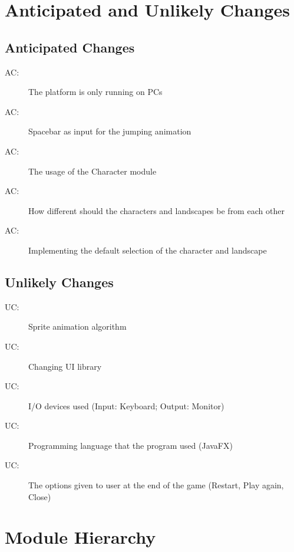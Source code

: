 \documentclass[12pt, titlepage]{article}
\newcounter{acnum}
\newcommand{\actheacnum}{AC\theacnum}
\newcounter{ucnum}
\newcommand{\uctheucnum}{UC\theucnum}
\begin{document}
\section{Anticipated and Unlikely Changes} \label{SecChange}

\subsection{Anticipated Changes} \label{SecAchange}
\begin{description}
\item[ \actheacnum \label{ac1}:] The platform is only running on PCs
\item[ \actheacnum \label{ac2}:] Spacebar as input for the jumping animation
\item[ \actheacnum \label{ac3}:] The usage of the Character module
\item[ \actheacnum \label{ac4}:] How different should the characters and landscapes be from each other
\item[ \actheacnum \label{ac5}:] Implementing the default selection of the character and landscape
\end{description}

\subsection{Unlikely Changes} \label{SecUchange}
\begin{description}
\item[ \uctheucnum \label{uc1}:] Sprite animation algorithm
\item[ \uctheucnum \label{uc2}:] Changing UI library
\item[ \uctheucnum \label{uc3}:] I/O devices used (Input: Keyboard; Output: Monitor)
\item[ \uctheucnum \label{uc4}:] Programming language that the program used (JavaFX)
\item[ \uctheucnum \label{uc5}:] The options given to user at the end of the game (Restart, Play again, Close)
\end{description}

\section{Module Hierarchy} \label{SecMH}
\end{document}
